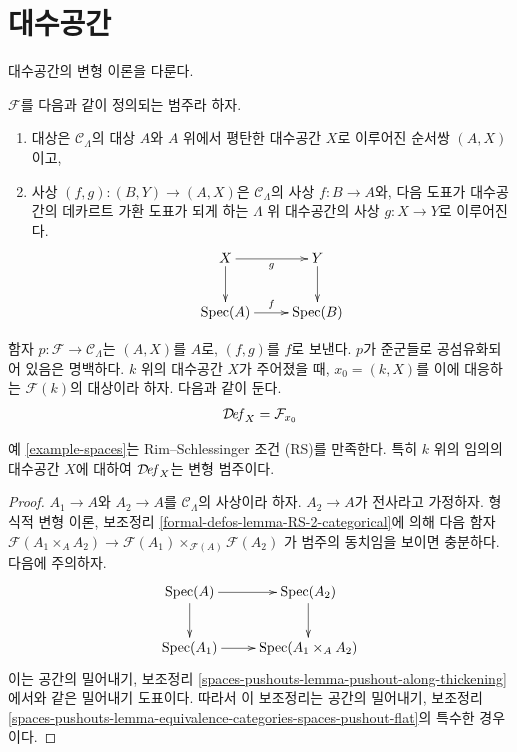 \section{대수공간}
\label{section-algebraic-spaces}

\noindent
대수공간의 변형 이론을 다룬다.

\begin{example}[대수공간]
\label{example-spaces}
$\mathcal{F}$를 다음과 같이 정의되는 범주라 하자.
\begin{enumerate}
\item 대상은 $\mathcal{C}_\Lambda$의 대상 $A$와 $A$ 위에서 평탄한
대수공간 $X$로 이루어진 순서쌍 $(A, X)$이고,
\item 사상 $(f, g) : (B, Y) \to (A, X)$은
$\mathcal{C}_\Lambda$의 사상 $f : B \to A$와, 다음 도표가 대수공간의
데카르트 가환 도표가 되게 하는 $\Lambda$ 위 대수공간의 사상
$g : X \to Y$로 이루어진다.
$$
\xymatrix{
X \ar[r]_g \ar[d] & Y \ar[d] \\
\Spec(A) \ar[r]^f & \Spec(B)
}
$$
\end{enumerate}
함자 $p : \mathcal{F} \to \mathcal{C}_\Lambda$는 $(A, X)$를 $A$로,
$(f, g)$를 $f$로 보낸다. $p$가 준군들로 공섬유화되어 있음은 명백하다.
$k$ 위의 대수공간 $X$가 주어졌을 때, $x_0 = (k, X)$를 이에 대응하는
$\mathcal{F}(k)$의 대상이라 하자. 다음과 같이 둔다.
$$
\mathcal{D}\!\mathit{ef}_X = \mathcal{F}_{x_0}
$$
\end{example}

\begin{lemma}
\label{lemma-spaces-RS}
예 \ref{example-spaces}는 Rim--Schlessinger 조건 (RS)를 만족한다.
특히 $k$ 위의 임의의 대수공간 $X$에 대하여 $\mathcal{D}\!\mathit{ef}_X$는
변형 범주이다.
\end{lemma}

\begin{proof}
$A_1 \to A$와 $A_2 \to A$를 $\mathcal{C}_\Lambda$의 사상이라 하자.
$A_2 \to A$가 전사라고 가정하자. 형식적 변형 이론, 보조정리
\ref{formal-defos-lemma-RS-2-categorical}에 의해 다음 함자
$\mathcal{F}(A_1 \times_A A_2) \to
\mathcal{F}(A_1) \times_{\mathcal{F}(A)} \mathcal{F}(A_2)$
가 범주의 동치임을 보이면 충분하다. 다음에 주의하자.
$$
\xymatrix{
\Spec(A) \ar[r] \ar[d] & \Spec(A_2) \ar[d] \\
\Spec(A_1) \ar[r] &
\Spec(A_1 \times_A A_2)
}
$$
이는 공간의 밀어내기, 보조정리
\ref{spaces-pushouts-lemma-pushout-along-thickening}에서와 같은 밀어내기
도표이다. 따라서 이 보조정리는 공간의 밀어내기, 보조정리
\ref{spaces-pushouts-lemma-equivalence-categories-spaces-pushout-flat}의
특수한 경우이다.
\end{proof}

